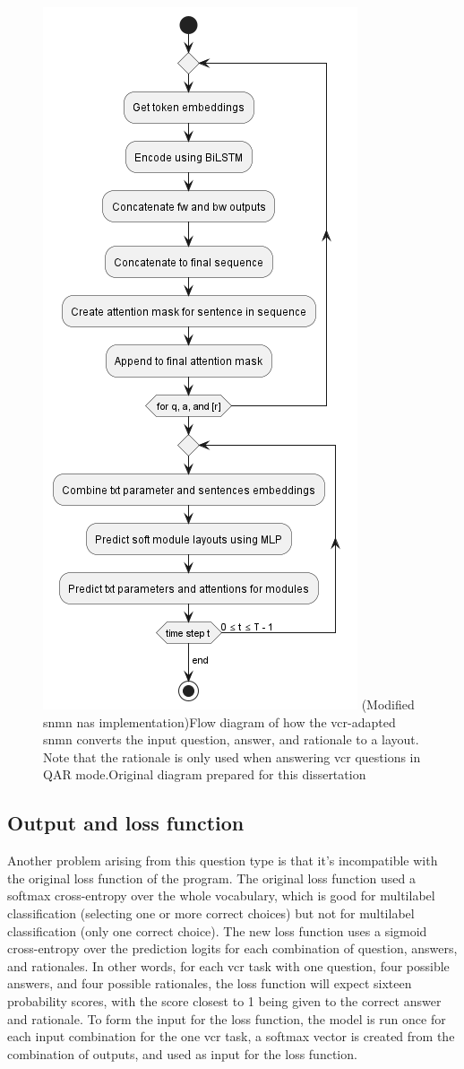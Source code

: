 \begin{figure}[htbp]
    \centering
    \includegraphics[width=.55\textwidth,keepaspectratio]{content/chapters/methodology/model_adaptation/figures/controller-layout-vcr-snmn.png}
    \captionsource(Modified \gls{snmn} \gls{nas} implementation){Flow diagram of how the \gls{vcr}-adapted \gls{snmn} converts the input question, answer, and rationale to a layout. Note that the rationale is only used when answering \gls{vcr} questions in QAR mode.\label{fig:vcr_snmn_input_unit}}{Original diagram prepared for this dissertation}
\end{figure}

\subsection{Output and loss function}
\label{subsec:output_and_loss_function}

Another problem arising from this question type is that it's incompatible with the original loss function of the program.
The original loss function used a softmax cross-entropy over the whole vocabulary, which is good for multilabel classification (selecting one or more correct choices) but not for multilabel classification (only one correct choice).
The new loss function uses a sigmoid cross-entropy over the prediction \glspl{logit} for each combination of question, answers, and rationales.
In other words, for each \gls{vcr} task with one question, four possible answers, and four possible rationales, the loss function will expect sixteen probability scores, with the score closest to 1 being given to the correct answer and rationale.
To form the input for the loss function, the model is run once for each input combination for the one \gls{vcr} task, a softmax vector is created from the combination of outputs, and used as input for the loss function.

